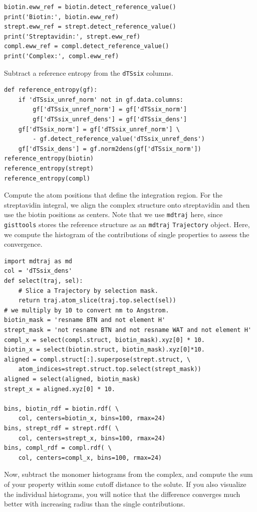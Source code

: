 \documentclass[9pt,tutorial]{livecoms}
\newcommand{\software}{\texttt}
\newcommand\inlinecode{\texttt}
\begin{document}
\begin{lstlisting}[style=python]
biotin.eww_ref = biotin.detect_reference_value()
print('Biotin:', biotin.eww_ref)
strept.eww_ref = strept.detect_reference_value()
print('Streptavidin:', strept.eww_ref)
compl.eww_ref = compl.detect_reference_value()
print('Complex:', compl.eww_ref)
\end{lstlisting}
Subtract a reference entropy from the \inlinecode{dTSsix} columns.

\begin{lstlisting}[style=python]
def reference_entropy(gf):
    if 'dTSsix_unref_norm' not in gf.data.columns:
        gf['dTSsix_unref_norm'] = gf['dTSsix_norm']
        gf['dTSsix_unref_dens'] = gf['dTSsix_dens']
    gf['dTSsix_norm'] = gf['dTSsix_unref_norm'] \
        - gf.detect_reference_value('dTSsix_unref_dens')
    gf['dTSsix_dens'] = gf.norm2dens(gf['dTSsix_norm'])
reference_entropy(biotin)
reference_entropy(strept)
reference_entropy(compl)
\end{lstlisting}
Compute the atom positions that define the integration region.
For the streptavidin integral, we align the complex structure onto streptavidin and then use the biotin positions as centers. Note that we use \software{mdtraj} here, since \software{gisttools} stores the reference structure as an \software{mdtraj} \inlinecode{Trajectory} object.
Here, we compute the histogram of the contributions of single properties to assess the convergence.

\begin{lstlisting}[style=python]
import mdtraj as md
col = 'dTSsix_dens'
def select(traj, sel):
    # Slice a Trajectory by selection mask.
    return traj.atom_slice(traj.top.select(sel))
# we multiply by 10 to convert nm to Angstrom.
biotin_mask = 'resname BTN and not element H'
strept_mask = 'not resname BTN and not resname WAT and not element H'
compl_x = select(compl.struct, biotin_mask).xyz[0] * 10.
biotin_x = select(biotin.struct, biotin_mask).xyz[0]*10.
aligned = compl.struct[:].superpose(strept.struct, \
    atom_indices=strept.struct.top.select(strept_mask))
aligned = select(aligned, biotin_mask)
strept_x = aligned.xyz[0] * 10.

bins, biotin_rdf = biotin.rdf( \
    col, centers=biotin_x, bins=100, rmax=24)
bins, strept_rdf = strept.rdf( \
    col, centers=strept_x, bins=100, rmax=24)
bins, compl_rdf = compl.rdf( \
    col, centers=compl_x, bins=100, rmax=24)
\end{lstlisting}
Now, subtract the monomer histograms from the complex, and compute the sum of your property within some cutoff distance to the solute.
If you also visualize the individual histograms, you will notice that the difference converges much better with increasing radius than the single contributions.
\end{document}
